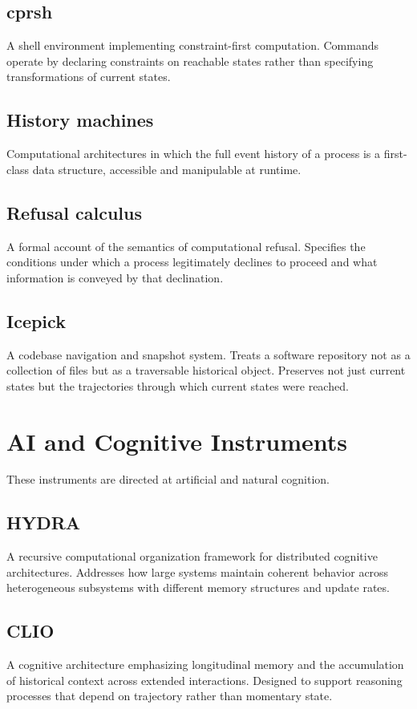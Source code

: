 \documentclass[12pt, openany]{book}
\begin{document}
\subsection{cprsh} A shell environment implementing constraint-first
computation. Commands operate by declaring constraints on reachable states
rather than specifying transformations of current states.

\subsection{History machines} Computational architectures in which the full
event history of a process is a first-class data structure, accessible and
manipulable at runtime.

\subsection{Refusal calculus} A formal account of the semantics of
computational refusal. Specifies the conditions under which a process
legitimately declines to proceed and what information is conveyed by that
declination.

\subsection{Icepick} A codebase navigation and snapshot system. Treats a
software repository not as a collection of files but as a traversable
historical object. Preserves not just current states but the trajectories
through which current states were reached.

\section{AI and Cognitive Instruments}

These instruments are directed at artificial and natural cognition.

\subsection{HYDRA} A recursive computational organization framework for
distributed cognitive architectures. Addresses how large systems maintain
coherent behavior across heterogeneous subsystems with different memory
structures and update rates.

\subsection{CLIO} A cognitive architecture emphasizing longitudinal memory
and the accumulation of historical context across extended interactions.
Designed to support reasoning processes that depend on trajectory rather
than momentary state.
\end{document}
